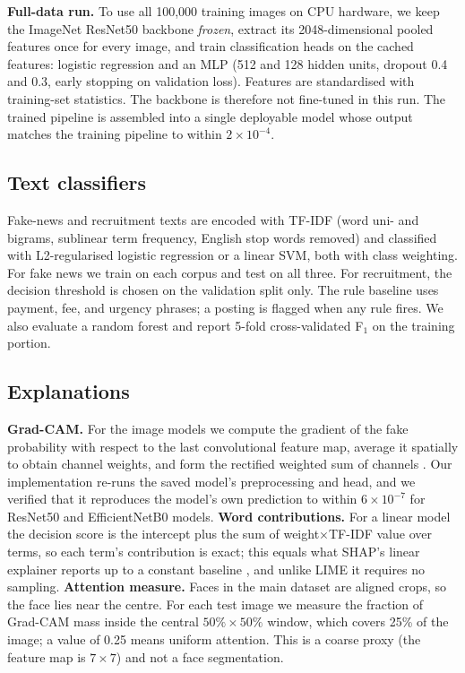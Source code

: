 \documentclass[11pt,a4paper]{article}
\begin{document}
\textbf{Full-data run.} To use all 100{,}000 training images on CPU hardware, we keep the ImageNet ResNet50 backbone \emph{frozen}, extract its 2048-dimensional pooled features once for every image, and train classification heads on the cached features: logistic regression and an MLP (512 and 128 hidden units, dropout 0.4 and 0.3, early stopping on validation loss). Features are standardised with training-set statistics. The backbone is therefore not fine-tuned in this run. The trained pipeline is assembled into a single deployable model whose output matches the training pipeline to within $2\times10^{-4}$.

\subsection{Text classifiers}
Fake-news and recruitment texts are encoded with TF-IDF (word uni- and bigrams, sublinear term frequency, English stop words removed) and classified with L2-regularised logistic regression or a linear SVM, both with class weighting. For fake news we train on each corpus and test on all three. For recruitment, the decision threshold is chosen on the validation split only. The rule baseline uses payment, fee, and urgency phrases; a posting is flagged when any rule fires. We also evaluate a random forest and report 5-fold cross-validated F$_1$ on the training portion.

\subsection{Explanations}
\textbf{Grad-CAM.} For the image models we compute the gradient of the fake probability with respect to the last convolutional feature map, average it spatially to obtain channel weights, and form the rectified weighted sum of channels \cite{selvaraju2017gradcam}. Our implementation re-runs the saved model's preprocessing and head, and we verified that it reproduces the model's own prediction to within $6\times10^{-7}$ for ResNet50 and EfficientNetB0 models. \textbf{Word contributions.} For a linear model the decision score is the intercept plus the sum of weight$\times$TF-IDF value over terms, so each term's contribution is exact; this equals what SHAP's linear explainer reports up to a constant baseline \cite{lundberg2017shap}, and unlike LIME \cite{ribeiro2016lime} it requires no sampling. \textbf{Attention measure.} Faces in the main dataset are aligned crops, so the face lies near the centre. For each test image we measure the fraction of Grad-CAM mass inside the central $50\%\times50\%$ window, which covers 25\% of the image; a value of 0.25 means uniform attention. This is a coarse proxy (the feature map is $7\times7$) and not a face segmentation.
\end{document}
